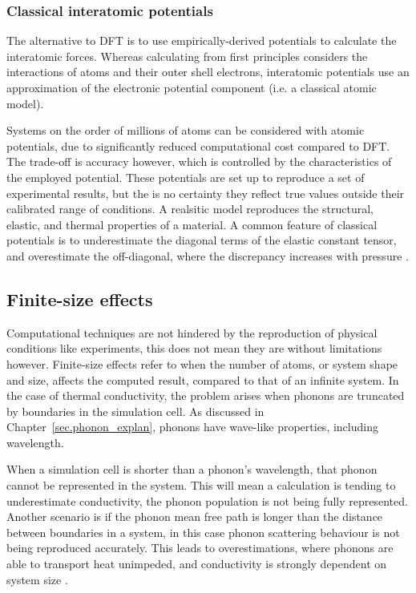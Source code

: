 \subsubsection{Classical interatomic potentials}

The alternative to DFT is to use empirically-derived potentials to calculate the interatomic forces. Whereas calculating from first principles considers the interactions of atoms and their outer shell electrons, interatomic potentials use an approximation of the electronic potential component (i.e. a classical atomic model). 

Systems on the order of millions of atoms can be considered with atomic potentials, due to significantly reduced computational cost compared to DFT. The trade-off is accuracy however, which is controlled by the characteristics of the employed potential. These potentials are set up to reproduce a set of experimental results, but the is no certainty they reflect true values outside their calibrated range of conditions. A realsitic model reproduces the structural, elastic, and thermal properties of a material. A common feature of classical potentials is to underestimate the diagonal terms of the elastic constant tensor, and overestimate the off-diagonal, where the discrepancy increases with pressure \citep{Chen2012}.



\subsection{Finite-size effects}

Computational techniques are not hindered by the reproduction of physical conditions like experiments, this does not mean they are without limitations however. Finite-size effects refer to when the number of atoms, or system shape and size, affects the computed result, compared to that of an infinite system. In the case of thermal conductivity, the problem arises when phonons are truncated by boundaries in the simulation cell. As discussed in Chapter~\ref{sec.phonon_explan}, phonons have wave-like properties, including wavelength. 

When a simulation cell is shorter than a phonon's wavelength, that phonon cannot be represented in the system. This will mean a calculation is tending to underestimate conductivity, the phonon population is not being fully represented. Another scenario is if the phonon mean free path is longer than the distance between boundaries in a system, in this case phonon scattering behaviour is not being reproduced accurately. This leads to overestimations, where phonons are able to transport heat unimpeded, and conductivity is strongly dependent on system size \citep{Tadano2014}. 

